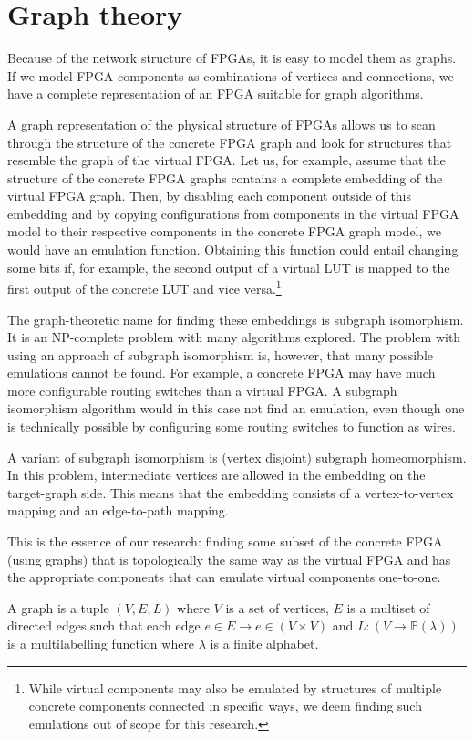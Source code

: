 \section{Graph theory}
Because of the network structure of FPGAs, it is easy to model them as graphs. If we model FPGA components as combinations of vertices and connections, we have a complete representation of an FPGA suitable for graph algorithms.

A graph representation of the physical structure of FPGAs allows us to scan through the structure of the concrete FPGA graph and look for structures that resemble the graph of the virtual FPGA. Let us, for example, assume that the structure of the concrete FPGA graphs contains a complete embedding of the virtual FPGA graph. Then, by disabling each component outside of this embedding and by copying configurations from components in the virtual FPGA model to their respective components in the concrete FPGA graph model, we would have an emulation function. Obtaining this function could entail changing some bits if, for example, the second output of a virtual LUT is mapped to the first output of the concrete LUT and vice versa.\footnote{While virtual components may also be emulated by structures of multiple concrete components connected in specific ways, we deem finding such emulations out of scope for this research.}

The graph-theoretic name for finding these embeddings is subgraph isomorphism. It is an NP-complete problem\cite{cook} with many algorithms explored. The problem with using an approach of subgraph isomorphism is, however, that many possible emulations cannot be found. For example, a concrete FPGA may have much more configurable routing switches than a virtual FPGA. A subgraph isomorphism algorithm would in this case not find an emulation, even though one is technically possible by configuring some routing switches to function as wires.

A variant of subgraph isomorphism is (vertex disjoint) subgraph homeomorphism. In this problem, intermediate vertices are allowed in the embedding on the target-graph side. This means that the embedding consists of a vertex-to-vertex mapping and an edge-to-path mapping.

This is the essence of our research: finding some subset of the concrete FPGA (using graphs) that is topologically the same way as the virtual FPGA and has the appropriate components that can emulate virtual components one-to-one.

\begin{defn}[graph]
A graph is a tuple $(V, E, L)$ where $V$ is a set of vertices, $E$ is a multiset of directed edges such that each edge $e \in E \to e \in (V \times V)$ and $L: (V \to \mathbb{P}(\lambda))$ is a multilabelling function where $\lambda$ is a finite alphabet.
\label{def:graph}
\end{defn}


